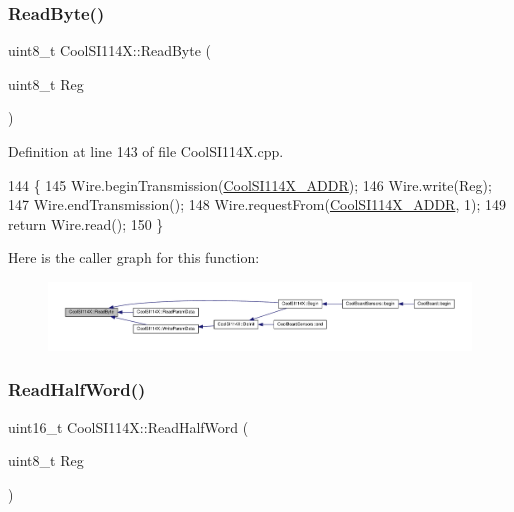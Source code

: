 \subsubsection{\texorpdfstring{Read\+Byte()}{ReadByte()}}
{\footnotesize\ttfamily uint8\+\_\+t Cool\+S\+I114\+X\+::\+Read\+Byte (\begin{DoxyParamCaption}\item[{uint8\+\_\+t}]{Reg }\end{DoxyParamCaption})\hspace{0.3cm}{\ttfamily [private]}}



Definition at line 143 of file Cool\+S\+I114\+X.\+cpp.


\begin{DoxyCode}
144 \{
145     Wire.beginTransmission(\hyperlink{_cool_s_i114_x_8h_a1d1122c2b489dc4718053dd79f9760fe}{CoolSI114X\_ADDR});
146     Wire.write(Reg);
147     Wire.endTransmission();
148     Wire.requestFrom(\hyperlink{_cool_s_i114_x_8h_a1d1122c2b489dc4718053dd79f9760fe}{CoolSI114X\_ADDR}, 1);  
149     \textcolor{keywordflow}{return} Wire.read();
150 \}
\end{DoxyCode}
Here is the caller graph for this function\+:\nopagebreak
\begin{figure}[H]
\begin{center}
\leavevmode
\includegraphics[width=350pt]{dd/d67/class_cool_s_i114_x_acc20f8037e156ec4aadcbe90780b1e8b_icgraph}
\end{center}
\end{figure}
\mbox{\label{class_cool_s_i114_x_a1d25c9e137874af529804c2ec796a6b9}} 
\subsubsection{\texorpdfstring{Read\+Half\+Word()}{ReadHalfWord()}}
{\footnotesize\ttfamily uint16\+\_\+t Cool\+S\+I114\+X\+::\+Read\+Half\+Word (\begin{DoxyParamCaption}\item[{uint8\+\_\+t}]{Reg }\end{DoxyParamCaption})\hspace{0.3cm}{\ttfamily [private]}}



